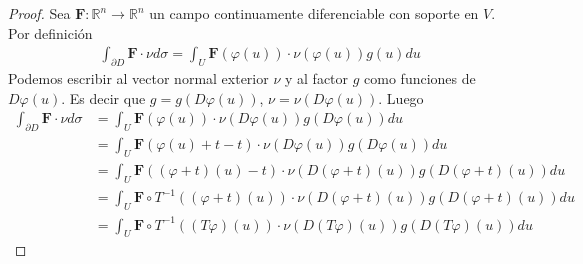 \documentclass{report}
\newcommand{\realNumbers}{\mathbb{R}}
\theoremstyle{definition}
\theoremstyle{remark}
\begin{document}
\begin{proof}
    Sea \(\mathbf{F} : \realNumbers^n \rightarrow \realNumbers^n\) un campo continuamente diferenciable con soporte en \(V\).
    Por definición
    \begin{align}
      \int_{\partial D} \mathbf{F} \cdot \nu d \sigma
      =
      \int_U
        \mathbf{F}(\varphi(u))
        \cdot
        \nu(\varphi(u))
        g(u)
      du
    \end{align}
    Podemos escribir al vector normal exterior \(\nu\) y al factor \(g\) como funciones de \(D \varphi (u)\).
    Es decir que \(g = g(D \varphi (u))\), \(\nu = \nu(D\varphi(u))\). %
    Luego
    \begin{align}
      \int_{\partial D} \mathbf{F} \cdot \nu d \sigma
      &=
      \int_U
        \mathbf{F}(\varphi(u))
        \cdot
        \nu(D \varphi(u))
        g(D \varphi(u))
      du
      \\
      &=
      \int_U
        \mathbf{F}(\varphi(u) + t - t)
        \cdot
        \nu(D \varphi(u))
        g(D \varphi(u))
      du
      \\
      &=
      \int_U
        \mathbf{F}((\varphi + t)(u) - t)
        \cdot
        \nu(D (\varphi + t)(u))
        g(D (\varphi + t)(u))
      du
      \\
      &=
      \int_U
        \mathbf{F} \circ T^{- 1} ((\varphi + t)(u))
        \cdot
        \nu(D (\varphi + t)(u))
        g(D (\varphi + t)(u))
      du
      \\
      &=
      \int_U
        \mathbf{F} \circ T^{- 1} ((T \varphi)(u))
        \cdot
        \nu(D (T \varphi)(u))
        g(D (T \varphi)(u))
      du
    \end{align}
  \end{proof}
\end{document}

